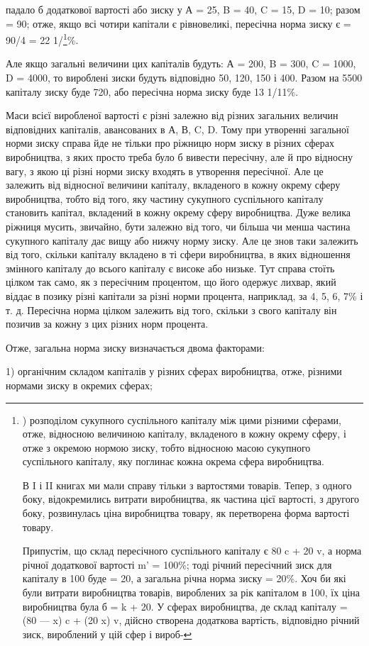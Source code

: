 падало б додаткової вартості або зиску у А = 25, B = 40, C = 15, D = 10; разом = 90; отже, якщо всі
чотири капітали є рівновеликі, пересічна норма зиску є = 90/4 = 22 1/\footnote{
) розподілом сукупного суспільного капіталу між цими різними сферами, отже, відносною величиною
капіталу, вкладеного
в кожну окрему сферу, і отже з окремою нормою зиску, тобто
відносною масою сукупного суспільного капіталу, яку поглинає
кожна окрема сфера виробництва.

В I і II книгах ми мали справу тільки з вартостями товарів.
Тепер, з одного боку, відокремились витрати виробництва, як
частина цієї вартості, з другого боку, розвинулась ціна виробництва товару, як перетворена форма
вартості товару.

Припустім, що склад пересічного суспільного капіталу є
80 c + 20 v, а норма річної додаткової вартості m' = 100\%; тоді
річний пересічний зиск для капіталу в 100 буде = 20, а загальна
річна норма зиску = 20\%. Хоч би які були витрати виробництва
товарів, вироблених за рік капіталом в 100, їх ціна виробництва була б = k + 20. У сферах
виробництва, де склад капіталу = (80 — x) c + (20 x) v, дійсно створена додаткова вартість,
відповідно річний зиск, вироблений у цій сфер і вироб-
}\%.

Але якщо загальні величини цих капіталів будуть: А = 200, B = 300, C = 1000, D = 4000, то вироблені
зиски будуть відповідно 50, 120, 150 і 400. Разом на 5500 капіталу зиску буде 720, або пересічна
норма зиску буде 13 1/11\%.

Маси всієї виробленої вартості є різні залежно від різних загальних величин відповідних капіталів,
авансованих в А, В, C, D.
Тому при утворенні загальної норми зиску справа йде не тільки
про ріжницю норм зиску в різних сферах виробництва, з яких
просто треба було б вивести пересічну, але й про відносну вагу,
з якою ці різні норми зиску входять в утворення пересічної.
Але це залежить від відносної величини капіталу, вкладеного
в кожну окрему сферу виробництва, тобто від того, яку частину
сукупного суспільного капіталу становить капітал, вкладений
в кожну окрему сферу виробництва. Дуже велика ріжниця мусить, звичайно, бути залежно від того, чи
більша чи менша
частина сукупного капіталу дає вищу або нижчу норму зиску.
Але це знов таки залежить від того, скільки капіталу вкладено
в ті сфери виробництва, в яких відношення змінного капіталу
до всього капіталу є високе або низьке. Тут справа стоїть цілком
так само, як з пересічним процентом, що його одержує лихвар,
який віддає в позику різні капітали за різні норми процента, наприклад, за 4, 5, 6, 7\% і т. д.
Пересічна норма цілком залежить
від того, скільки з свого капіталу він позичив за кожну з цих
різних норм процента.

Отже, загальна норма зиску визначається двома факторами:

1) органічним складом капіталів у різних сферах виробництва,
отже, різними нормами зиску в окремих сферах;